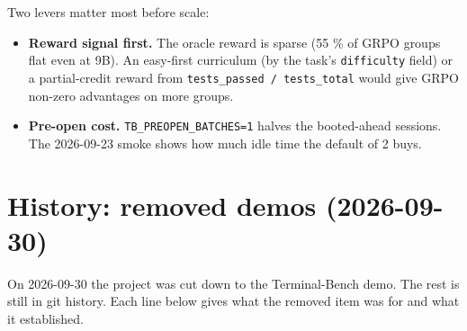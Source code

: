 \documentclass[
  paper=a4,
  ,captions=tableheading
]{scrartcl}
\providecommand{\tightlist}{%
  \setlength{\itemsep}{0pt}\setlength{\parskip}{0pt}}
\begin{document}
Two levers matter most before scale:

\begin{itemize}
\tightlist
\item
  \textbf{Reward signal first.} The oracle reward is sparse (55 \% of
  GRPO groups flat even at 9B). An easy-first curriculum (by the task's
  \texttt{difficulty} field) or a partial-credit reward from
  \texttt{tests\_passed\ /\ tests\_total} would give GRPO non-zero
  advantages on more groups.
\item
  \textbf{Pre-open cost.} \texttt{TB\_PREOPEN\_BATCHES=1} halves the
  booted-ahead sessions. The 2026-09-23 smoke shows how much idle time
  the default of 2 buys.
\end{itemize}

\hypertarget{history-removed-demos-2026-09-30}{%
\section{History: removed demos
(2026-09-30)}\label{history-removed-demos-2026-09-30}}

On 2026-09-30 the project was cut down to the Terminal-Bench demo. The
rest is still in git history. Each line below gives what the removed
item was for and what it established.
\end{document}
